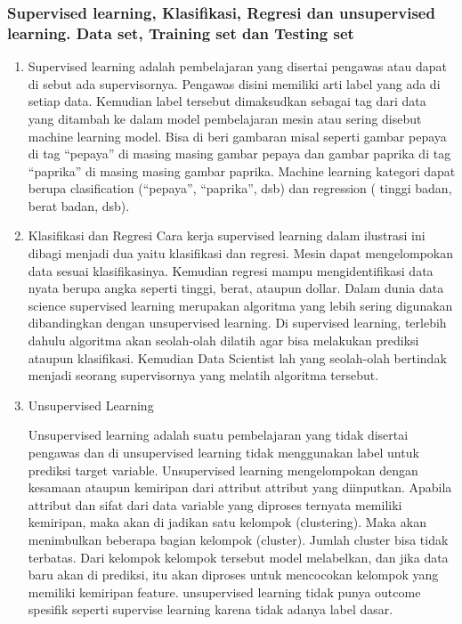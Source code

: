     

    \subsubsection{Supervised learning, Klasiﬁkasi, Regresi dan unsupervised learning. Data set, Training set dan Testing set}
    
    \begin{enumerate}
    
    \item Supervised learning adalah pembelajaran yang disertai pengawas atau dapat di sebut ada supervisornya. Pengawas disini memiliki arti label yang ada di setiap data. Kemudian label tersebut dimaksudkan sebagai tag dari data yang ditambah ke dalam model pembelajaran mesin atau sering disebut machine learning model. Bisa di beri gambaran misal seperti gambar pepaya di tag “pepaya” di masing masing gambar pepaya dan gambar paprika di tag “paprika” di masing masing gambar paprika. Machine learning kategori dapat berupa clasification (“pepaya”, “paprika”, dsb) dan regression ( tinggi badan, berat badan, dsb). 

    \item Klasifikasi dan Regresi
Cara kerja supervised learning dalam ilustrasi ini dibagi menjadi dua yaitu klasifikasi dan regresi. Mesin dapat mengelompokan data sesuai klasifikasinya. Kemudian regresi mampu mengidentifikasi data nyata berupa angka seperti tinggi, berat, ataupun dollar. Dalam dunia data science supervised learning merupakan algoritma yang lebih sering digunakan dibandingkan dengan unsupervised learning. Di supervised learning, terlebih dahulu algoritma akan seolah-olah dilatih agar bisa melakukan prediksi ataupun klasifikasi. Kemudian Data Scientist lah yang seolah-olah bertindak menjadi seorang supervisornya yang melatih algoritma tersebut. 

\item Unsupervised Learning
\par
Unsupervised learning adalah suatu pembelajaran yang tidak disertai pengawas dan di unsupervised learning tidak menggunakan label untuk prediksi target variable. Unsupervised learning mengelompokan dengan kesamaan ataupun kemiripan dari attribut attribut yang diinputkan. Apabila attribut dan sifat dari data variable yang diproses ternyata memiliki kemiripan, maka akan di jadikan satu kelompok (clustering). Maka akan menimbulkan beberapa bagian kelompok (cluster). Jumlah cluster bisa tidak terbatas. Dari kelompok kelompok tersebut model melabelkan, dan jika data baru akan di prediksi, itu akan diproses untuk mencocokan kelompok yang memiliki kemiripan feature. unsupervised learning tidak punya outcome spesifik seperti supervise learning karena tidak adanya label dasar.


\end{enumerate}

